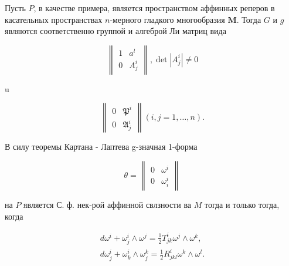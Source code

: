 \documentclass[10pt]{article}
\begin{document}
Пусть $P$, в качестве примера, является пространством аффинных реперов в касательных пространствах $n$-мерного гладкого многообразия $\boldsymbol{M}$. Тогда $G$ и $g$ являются соответственно группой и алгеброй Ли матриц вида



\[

\left\|\begin{array}{ll}

1 & a^{l} \\

0 & A_{j}^{i}

\end{array}\right\|, \operatorname{det}\left|A_{j}^{i}\right| \neq 0

\]



u



\[

\left\|\begin{array}{cc}

0 & \mathfrak{P}^{i} \\

0 & \mathfrak{A}_{j}^{i}

\end{array}\right\|(i, j=1, \ldots, n) .

\]



В силу теоремы Картана - Лаптева g-значная 1-форма



\[

\theta=\left\|\begin{array}{ll}

0 & \omega^{i} \\

0 & \omega_{i}^{i}

\end{array}\right\|

\]



на $P$ является С. ф. нек-рой аффинной свлзности ва $M$ тогда и только тогда, когда



\[

\begin{array}{r}

d \omega^{i}+\omega_{j}^{i} \wedge \omega^{j}=\frac{1}{2} T_{j k}^{i} \omega^{j} \wedge \omega^{k}, \\

d \omega_{j}^{i}+\omega_{k}^{i} \wedge \omega_{j}^{k}=\frac{1}{2} R_{j k l}^{i} \omega^{k} \wedge \omega^{l} .

\end{array}

\]
\end{document}
